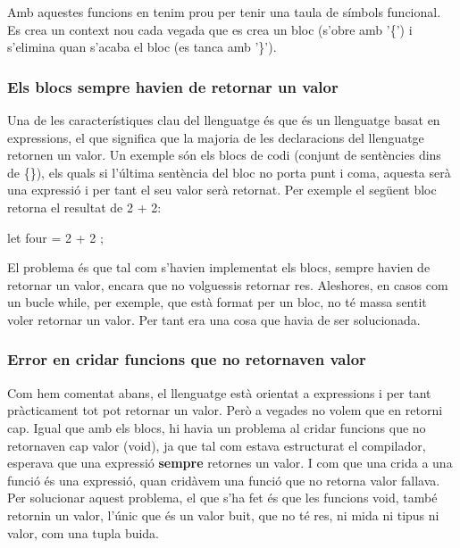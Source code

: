 ﻿\documentclass{article}
\begin{document}
Amb aquestes funcions en tenim prou per tenir una taula de símbols funcional. Es
crea un context nou cada vegada que es crea un bloc (s'obre amb '\{') i
s'elimina quan s'acaba el bloc (es tanca amb '\}').

\subsubsection{Els blocs sempre havien de retornar un valor}

Una de les característiques clau del llenguatge és que és un llenguatge basat en
expressions, el que significa que la majoria de les declaracions del llenguatge
retornen un valor. Un exemple són els blocs de codi (conjunt de sentències dins
de \{\}), els quals si l'última sentència del bloc no porta punt i coma, aquesta
serà una expressió i per tant el seu valor serà retornat. Per exemple el següent
bloc retorna el resultat de 2 + 2:

\begin{code}
    let four = { 2 + 2 };
\end{code}

El problema és que tal com s'havien implementat els blocs, sempre havien de
retornar un valor, encara que no volguessis retornar res. Aleshores, en casos
com un bucle while, per exemple, que està format per un bloc, no té massa sentit
voler retornar un valor. Per tant era una cosa que havia de ser solucionada.

\subsubsection{Error en cridar funcions que no retornaven valor}

Com hem comentat abans, el llenguatge està orientat a expressions i per tant
pràcticament tot pot retornar un valor. Però a vegades no volem que en retorni
cap. Igual que amb els blocs, hi havia un problema al cridar funcions que no
retornaven cap valor (void), ja que tal com estava estructurat el compilador,
esperava que una expressió \textbf{sempre} retornes un valor. I com que una
crida a una funció és una expressió, quan cridàvem una funció que no retorna
valor fallava. Per solucionar aquest problema, el que s'ha fet és que les
funcions void, també retornin un valor, l'únic que és un valor buit, que no té
res, ni mida ni tipus ni valor, com una tupla buida.
\end{document}
